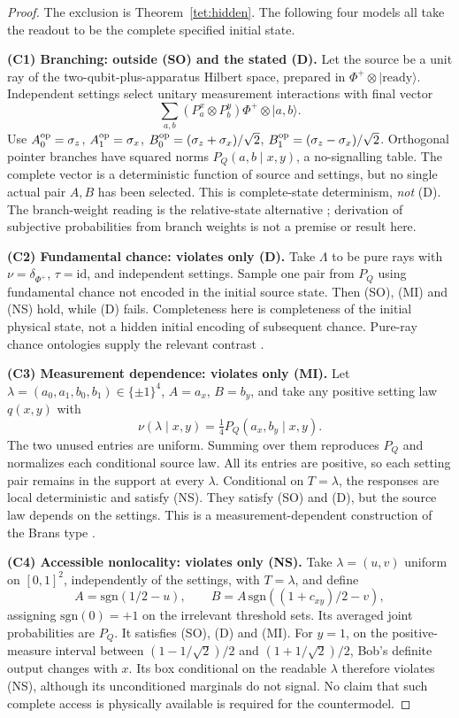 \documentclass[11pt,a4paper]{article}
\theoremstyle{definition}
\theoremstyle{remark}\newtheorem{remark}[theorem]{Remark}
\newcommand{\ket}[1]{\lvert#1\rangle}
\begin{document}
\begin{proof}
The exclusion is Theorem~\ref{tet:hidden}. The following four models all take the readout to be the complete specified initial state.

\textbf{(C1) Branching: outside (SO) and the stated (D).}
Let the source be a unit ray of the two-qubit-plus-apparatus Hilbert space, prepared in $\Phi^+\otimes\ket{\mathrm{ready}}$. Independent settings select unitary measurement interactions with final vector
\[
 \sum_{a,b}(P_a^x\otimes P_b^y)\Phi^+\otimes\ket{a,b}.
\]
Use $A_0^{\rm op}=\sigma_z$, $A_1^{\rm op}=\sigma_x$,
$B_0^{\rm op}=(\sigma_z+\sigma_x)/\sqrt2$,
$B_1^{\rm op}=(\sigma_z-\sigma_x)/\sqrt2$. Orthogonal pointer branches have squared norms $P_Q(a,b\mid x,y)$, a no-signalling table. The complete vector is a deterministic function of source and settings, but no single actual pair $A,B$ has been selected. This is complete-state determinism, \emph{not} (D). The branch-weight reading is the relative-state alternative \cite{Everett57,Deutsch99,Wallace12}; derivation of subjective probabilities from branch weights is not a premise or result here.

\textbf{(C2) Fundamental chance: violates only (D).}
Take $\Lambda$ to be pure rays with $\nu=\delta_{\Phi^+}$, $\tau=\mathrm{id}$, and independent settings. Sample one pair from $P_Q$ using fundamental chance not encoded in the initial source state. Then (SO), (MI) and (NS) hold, while (D) fails. Completeness here is completeness of the initial physical state, not a hidden initial encoding of subsequent chance. Pure-ray chance ontologies supply the relevant contrast \cite{BB95,GRW86}.

\textbf{(C3) Measurement dependence: violates only (MI).}
Let $\lambda=(a_0,a_1,b_0,b_1)\in\{\pm1\}^4$, $A=a_x$, $B=b_y$, and take any positive setting law $q(x,y)$ with
\[
 \nu(\lambda\mid x,y)=\tfrac14 P_Q(a_x,b_y\mid x,y).
\]
The two unused entries are uniform. Summing over them reproduces $P_Q$ and normalizes each conditional source law. All its entries are positive, so each setting pair remains in the support at every $\lambda$. Conditional on $T=\lambda$, the responses are local deterministic and satisfy (NS). They satisfy (SO) and (D), but the source law depends on the settings. This is a measurement-dependent construction of the Brans type \cite{Brans88}.

\textbf{(C4) Accessible nonlocality: violates only (NS).}
Take $\lambda=(u,v)$ uniform on $[0,1]^2$, independently of the settings, with $T=\lambda$, and define
\[
 A=\mathrm{sgn}(1/2-u),\qquad
 B=A\,\mathrm{sgn}((1+c_{xy})/2-v),
\]
assigning $\mathrm{sgn}(0)=+1$ on the irrelevant threshold sets. Its averaged joint probabilities are $P_Q$. It satisfies (SO), (D) and (MI). For $y=1$, on the positive-measure interval between $(1-1/\sqrt2)/2$ and $(1+1/\sqrt2)/2$, Bob's definite output changes with $x$. Its box conditional on the readable $\lambda$ therefore violates (NS), although its unconditioned marginals do not signal. No claim that such complete access is physically available is required for the countermodel.
\end{proof}
\end{document}
